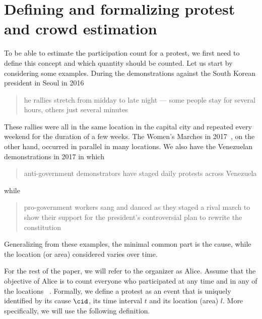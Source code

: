 \section{Defining and formalizing protest and crowd estimation}%
\label{system-model}


To be able to estimate the participation count for a protest, we first need to define this concept and which quantity should be counted.
Let us start by considering some examples.
During the demonstrations against the South Korean president in Seoul in 2016
\blockcquote{2016DemonstrationsInSeoul}{%
  he rallies stretch from midday to late night --- some people stay for several hours, others just several minutes%
}.
These rallies were all in the same location in the capital city and repeated every weekend for the duration of a few weeks.
The Women's Marches in 2017~\cite{2017WomensMarchesInUS}, on the other hand, occurred in parallel in many locations.
We also have the Venezuelan demonstrations in 2017 in which \blockcquote{2017VenezuelaProtestFrequency}{%
  anti-government demonstrators have staged daily protests across Venezuela%
} while
\blockcquote{AlJazeeraOnVenezuela2017}{%
  pro-government workers sang and danced as they staged a rival march to show their support for the president's controversial plan to rewrite the constitution%
}.
Generalizing from these examples, the minimal common part is the cause,%
\label{CauseIsTheCommonDenominator} while the location (or area) considered 
varies over time.

For the rest of the paper, we will refer to the organizer as Alice.
Assume that the objective of Alice is to count everyone who
participated at any time and in any of the
locations~\cite{2016DemonstrationsInSeoul} \sonja{commented out for
  repetition: %
}.
Formally, we define a protest as an event that is uniquely identified by its cause \(\cid\), its time interval \(t\) and its location (area) \(l\).
More specifically, we will use the following definition.

